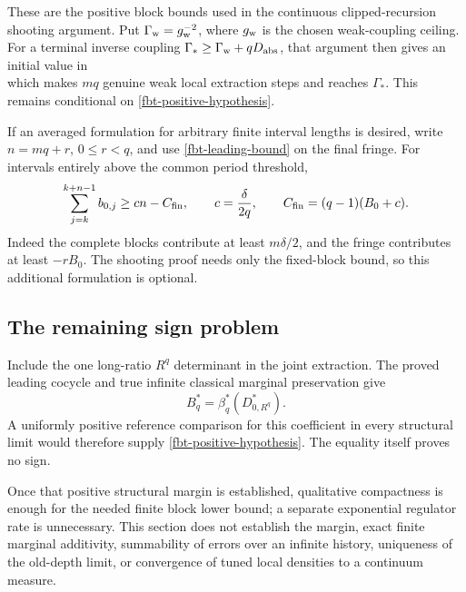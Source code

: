 These are the positive block bounds used in the
continuous clipped-recursion shooting argument.
Put \(\Gamma_{\rm w}=g_{\rm w}^{-2}\), where
\(g_{\rm w}\) is the chosen weak-coupling ceiling.
For a terminal inverse coupling
\(\Gamma_*\ge\Gamma_{\rm w}+qD_{\rm abs}\), that argument
then gives an initial value in
\begin{equation}
 [\,\Gamma_*+m\delta/4,\ \Gamma_*+mqD_{\rm abs}\,]
 \label{fbt-shooting-interval}
\end{equation}
which makes \(mq\) genuine weak local extraction steps
and reaches \(\Gamma_*\). This remains conditional on
\eqref{fbt-positive-hypothesis}.

If an averaged formulation for arbitrary finite
interval lengths is desired, write \(n=mq+r\),
\(0\le r<q\), and use \eqref{fbt-leading-bound} on
the final fringe. For intervals entirely above the
common period threshold,
\begin{equation}
 \sum_{j=k}^{k+n-1}b_{0,j}
 \ge cn-C_{\rm fin},\qquad
 c=\frac{\delta}{2q},\qquad
 C_{\rm fin}=(q-1)(B_0+c).
 \label{fbt-optional-fringe}
\end{equation}
Indeed the complete blocks contribute at least
\(m\delta/2\), and the fringe contributes at least
\(-rB_0\). The shooting proof needs only the fixed-block
bound, so this additional formulation is optional.

\subsection{The remaining sign problem}
\label{fbt-scope}

Include the one long-ratio \(R^q\) determinant in the
joint extraction. The proved leading cocycle and true
infinite classical marginal preservation give
\begin{equation}
                         B_q^*
                          =\beta_q^*(D_{0,R^q}^*).
 \label{fbt-long-ratio}
\end{equation}
A uniformly positive reference comparison for this
coefficient in every structural limit would therefore
supply \eqref{fbt-positive-hypothesis}. The equality
itself proves no sign.

Once that positive structural margin is established,
qualitative compactness is enough for the needed finite
block lower bound; a separate exponential regulator
rate is unnecessary. This section does not establish
the margin, exact finite marginal additivity, summability
of errors over an infinite history, uniqueness of the
old-depth limit, or convergence of tuned local densities
to a continuum measure.
